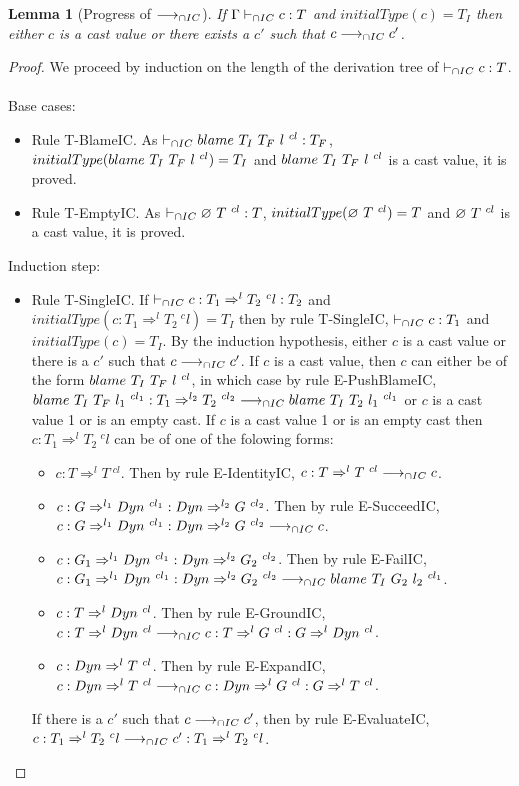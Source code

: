 \documentclass[a4paper]{article}
\newtheorem{lemma}{Lemma}
\begin{document}
\begin{lemma}[Progress of $\longrightarrow_{\cap IC}$]
\label{progressIC}
If $\Gamma \vdash_{\cap IC} c : T$ and $initialType(c) = T_I$ then either $c$ is a cast value or there exists a $c'$ such that $c \longrightarrow_{\cap IC} c'$.
\end{lemma}
\begin{proof}
We proceed by induction on the length of the derivation tree of $\vdash_{\cap IC} c : T$.\\\\
Base cases:
\begin{itemize}
    \item Rule T-BlameIC.
    As $\vdash_{\cap IC} blame\ T_I\ T_F\ l\ ^{cl} : T_F$, $initialType(blame\ T_I\ T_F\ l\ ^{cl}) = T_I$ and $blame\ T_I\ T_F\ l\ ^{cl}$ is a cast value, it is proved.
    \item Rule T-EmptyIC.
    As $\vdash_{\cap IC} \varnothing\ T\ ^{cl} : T$, $initialType(\varnothing\ T\ ^{cl}) = T$ and $\varnothing\ T\ ^{cl}$ is a cast value, it is proved.
\end{itemize}
Induction step:
\begin{itemize}
    \item Rule T-SingleIC.
    If $\vdash_{\cap IC} c : T_1 \Rightarrow^l T_2\ ^cl : T_2$ and $initialType(c : T_1 \Rightarrow^l T_2\ ^cl) = T_I$ then by rule T-SingleIC, $\vdash_{\cap IC} c : T_1$ and $initialType(c) = T_I$.
    By the induction hypothesis, either $c$ is a cast value or there is a $c'$ such that $c \longrightarrow_{\cap IC} c'$.
    If $c$ is a cast value, then $c$ can either be of the form $blame\ T_I\ T_F\ l\ ^{cl}$, in which case by rule E-PushBlameIC, $blame\ T_I\ T_F\ l_1\ ^{cl_1} : T_1 \Rightarrow^{l_2} T_2\ ^{cl_2} \longrightarrow_{\cap IC} blame\ T_I\ T_2\ l_1\ ^{cl_1}$ or $c$ is a cast value 1 or is an empty cast.
    If $c$ is a cast value 1 or is an empty cast then $c : T_1 \Rightarrow^l T_2\ ^cl$ can be of one of the folowing forms:
    \begin{itemize}
        \item $c : T \Rightarrow^l T\ ^{cl}$. Then by rule E-IdentityIC, $c : T \Rightarrow^l T\ ^{cl} \longrightarrow_{\cap IC} c$.
        \item $c : G \Rightarrow^{l_1} Dyn\ ^{cl_1} : Dyn \Rightarrow^{l_2} G\ ^{cl_2}$. Then by rule E-SucceedIC, $c : G \Rightarrow^{l_1} Dyn\ ^{cl_1} : Dyn \Rightarrow^{l_2} G\ ^{cl_2} \longrightarrow_{\cap IC} c$.
        \item $c : G_1 \Rightarrow^{l_1} \Dyn\ ^{cl_1} : \Dyn \Rightarrow^{l_2} G_2\ ^{cl_2}$. Then by rule E-FailIC, $c : G_1 \Rightarrow^{l_1} \Dyn\ ^{cl_1} : \Dyn \Rightarrow^{l_2} G_2\ ^{cl_2} \icos \blamecast{T_I}{G_2}{l_2}{cl_1}$.
        \item $c : T \Rightarrow^l \Dyn\ ^{cl}$. Then by rule E-GroundIC, $c : T \Rightarrow^l Dyn\ ^{cl} \longrightarrow_{\cap IC} c : T \Rightarrow^l G\ ^{cl} : G \Rightarrow^l Dyn\ ^{cl}$.
        \item $c : \Dyn \Rightarrow^l T\ ^{cl}$. Then by rule E-ExpandIC, $c : Dyn \Rightarrow^l T\ ^{cl} \longrightarrow_{\cap IC} c : Dyn \Rightarrow^l G\ ^{cl} : G \Rightarrow^l T\ ^{cl}$.
    \end{itemize}
    If there is a $c'$ such that $c \longrightarrow_{\cap IC} c'$, then by rule E-EvaluateIC, $c : T_1 \Rightarrow^l T_2\ ^cl \longrightarrow_{\cap IC} c' : T_1 \Rightarrow^l T_2\ ^cl$.
\end{itemize}
\end{proof}
\end{document}
